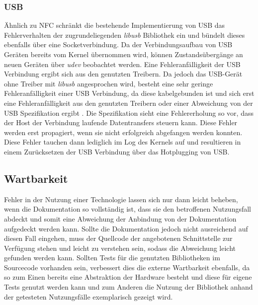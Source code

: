           \subsubsection{USB} Ähnlich zu NFC schränkt die bestehende Implementierung von USB das Fehlerverhalten der zugrundeliegenden {\it libusb} Bibliothek ein und bündelt dieses ebenfalls über eine Socketverbindung. Da der Verbindungsaufbau von USB Geräten bereits vom Kernel übernommen wird, können Zustandsübergänge an neuen Geräten über {\it udev} beobachtet werden. Eine Fehleranfälligkeit der USB Verbindung ergibt sich aus den genutzten Treibern. Da jedoch das USB-Gerät ohne Treiber mit {\it libusb} angesprochen wird, besteht eine sehr geringe Fehleranfälligkeit einer USB Verbindung, da diese kabelgebunden ist und sich erst eine Fehleranfälligkeit aus den genutzten Treibern oder einer Abweichung von der USB Spezifikation ergibt \cite{usbSpec}. Die Spezifikation sieht eine Fehlererholung so vor, dass der Host der Verbindung laufende Datentransfers steuern kann. Diese Fehler werden erst propagiert, wenn sie nicht erfolgreich abgefangen werden konnten. Diese Fehler tauchen dann lediglich im Log des Kernels auf und resultieren in einem Zurücksetzen der USB Verbindung über das Hotplugging von USB.
		
		\subsection{Wartbarkeit}
		Fehler in der Nutzung einer Technologie lassen sich nur dann leicht beheben, wenn die Dokumentation so vollständig ist, dass sie den betroffenen Nutzungsfall abdeckt und somit eine Abweichung der Anbindung von der Dokumentation aufgedeckt werden kann. Sollte die Dokumentation jedoch nicht ausreichend auf diesen Fall eingehen, muss der Quellcode der angebotenen Schnittstelle zur Verfügung stehen und leicht zu verstehen sein, sodass die Abweichung leicht gefunden werden kann. Sollten Tests für die genutzten Bibliotheken im Sourcecode vorhanden sein, verbessert dies die externe Wartbarkeit ebenfalls, da so zum Einen bereits eine Abstraktion der Hardware besteht und diese für eigene Tests genutzt werden kann und zum Anderen die Nutzung der Bibliothek anhand der getesteten Nutzungsfälle exemplarisch gezeigt wird.
		
